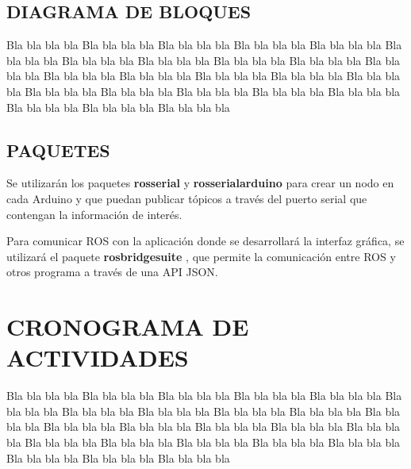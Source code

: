 \documentclass[letterpaper, 10 pt, conference]{ieeeconf}  %
\begin{document}
\subsection{DIAGRAMA DE BLOQUES}
Bla bla bla bla Bla bla bla bla Bla bla bla bla Bla bla bla bla
Bla bla bla bla Bla bla bla bla Bla bla bla bla Bla bla bla bla
Bla bla bla bla Bla bla bla bla Bla bla bla bla Bla bla bla bla
Bla bla bla bla Bla bla bla bla Bla bla bla bla Bla bla bla bla
Bla bla bla bla Bla bla bla bla Bla bla bla bla Bla bla bla bla
Bla bla bla bla Bla bla bla bla Bla bla bla bla Bla bla bla bla

\subsection{PAQUETES}
\label{paquetes}
Se utilizarán los paquetes \textbf{rosserial} \cite{rosserial} y \textbf{rosserial\textunderscore arduino} \cite{rosserialarduino} para crear un nodo en cada Arduino y que puedan publicar tópicos a través del puerto serial que contengan la información de interés.

Para comunicar ROS con la aplicación donde se desarrollará la interfaz gráfica, se utilizará el paquete \textbf{rosbridge\textunderscore suite} \cite{rosbridge}, que permite la comunicación entre ROS y otros programa a través de una API JSON.

\section{CRONOGRAMA DE ACTIVIDADES}
Bla bla bla bla Bla bla bla bla Bla bla bla bla Bla bla bla bla
Bla bla bla bla Bla bla bla bla Bla bla bla bla Bla bla bla bla
Bla bla bla bla Bla bla bla bla Bla bla bla bla Bla bla bla bla
Bla bla bla bla Bla bla bla bla Bla bla bla bla Bla bla bla bla
Bla bla bla bla Bla bla bla bla Bla bla bla bla Bla bla bla bla
Bla bla bla bla Bla bla bla bla Bla bla bla bla Bla bla bla bla



%






\end{document}
